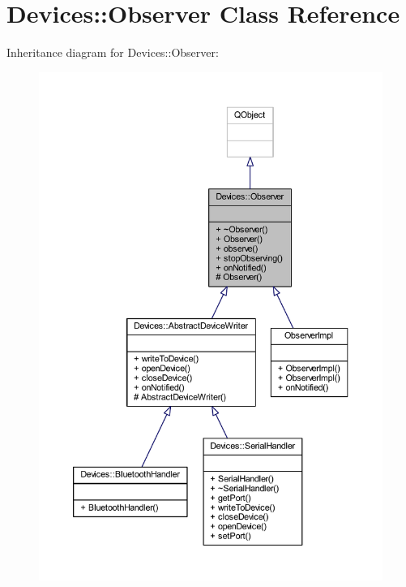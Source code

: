 \hypertarget{class_devices_1_1_observer}{}\section{Devices\+:\+:Observer Class Reference}
\label{class_devices_1_1_observer}


Inheritance diagram for Devices\+:\+:Observer\+:\nopagebreak
\begin{figure}[H]
\begin{center}
\leavevmode
\includegraphics[width=350pt]{db/d46/class_devices_1_1_observer__inherit__graph}
\end{center}
\end{figure}


